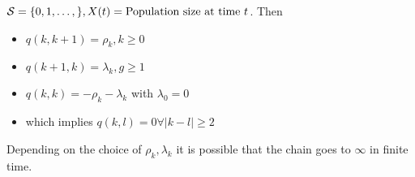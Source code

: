 \begin{example*}
    \(\mathcal{S}=\{0,1,\dots,\},X(t)=\text{Population size at time } t\). Then 
    \begin{itemize}
        \item \(q(k,k+1)=\rho_k, k\geq 0\)
        \item  \(q(k+1,k)=\lambda_k,g\geq 1\)
        \item \(q(k,k)=-\rho_k-\lambda_k\) with \(\lambda_0=0\)
        \item which implies \(q(k,l)=0\forall |k-l|\geq 2\)
    \end{itemize}
    Depending on the choice of \(\rho_k,\lambda_k\) it is possible that the chain goes to \(\infty\) in finite time.
\end{example*}

